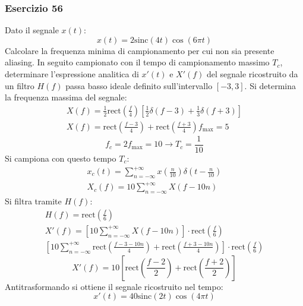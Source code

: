 \documentclass{article}
\newcommand{\rect}{\mathrm{rect}}
\newcommand{\sinc}{\mathrm{sinc}}
\begin{document}
\subsubsection*{Esercizio 56}

Dato il segnale $x(t)$:
\begin{equation*}
    x(t)=2\sinc(4t)\cos(6\pi t)
\end{equation*}
Calcolare la frequenza minima di campionamento per cui non sia presente aliasing. In seguito campionato con il tempo di campionamento massimo $T_c$, determinare 
l'espressione analitica di $x'(t)$ e $X'(f)$ del segnale ricostruito da un filtro $H(f)$ passa basso ideale definito sull'intervallo $[-3,3]$. 
Si determina la frequenza massima del segnale:
\begin{gather*}
    X(f)=\displaystyle\frac{1}{2}\rect\left(\frac{f}{4}\right)\left[\frac{1}{2}\delta(f-3)+\frac{1}{3}\delta(f+3)\right]\\
    X(f)=\rect\left(\displaystyle\frac{f-3}{4}\right)+\rect\left(\frac{f+3}{4}\right)
    f_{\max}=5
\end{gather*}
\begin{equation}
    f_c=2f_{\max}=10\to T_c=\displaystyle\frac{1}{10}
\end{equation}
Si campiona con questo tempo $T_c$:
\begin{gather*}
    x_c(t)=\displaystyle\sum_{n=-\infty}^{+\infty}x\left(\frac{n}{10}\right)\delta\left(t-\frac{n}{10}\right)\\
    X_c(f)=10\displaystyle\sum_{n=-\infty}^{+\infty}X(f-10n)
\end{gather*}
Si filtra tramite $H(f)$:
\begin{gather*}
    H(f)=\displaystyle\rect\left(\frac{f}{6}\right)\\
    X'(f)=\left[10\displaystyle\sum_{n=-\infty}^{+\infty}X(f-10n)\right]\cdot\rect\left(\frac{f}{6}\right)\\
    \left[10\displaystyle\sum_{n=-\infty}^{+\infty}\rect\left(\displaystyle\frac{f-3-10n}{4}\right)+\rect\left(\frac{f+3-10n}{4}\right)\right]\cdot\rect\left(\frac{f}{6}\right)
\end{gather*}
\begin{equation}
    X'(f)=10\left[\displaystyle\rect\left(\frac{f-2}{2}\right)+\rect\left(\frac{f+2}{2}\right)\right]
\end{equation}
Antitrasformando si ottiene il segnale ricostruito nel tempo:
\begin{equation}
    x'(t)=40\sinc(2t)\cos(4\pi t)
\end{equation}
\end{document}
